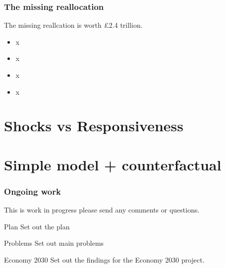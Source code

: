 \documentclass{beamer}
\begin{document}
\begin{frame}
\frametitle{The missing reallocation}

The missing reallcation is worth £2.4 trillion.

\begin{itemize}
\item x
\item x
\item x
\item x
\end{itemize}


\end{frame}


\section{Shocks vs Responsiveness}

\section{Simple model + counterfactual}



\begin{frame}
\frametitle{Ongoing work}

This is work in \alert{progress} please send any comments or questions.

\begin{block}{Plan}
Set out the plan
\end{block}

\begin{alertblock}{Problems}
Set out main problems
\end{alertblock}

\begin{examples}{Economy 2030}
Set out the findings for the Economy 2030 project.
\end{examples}
\end{frame}
\end{document}
